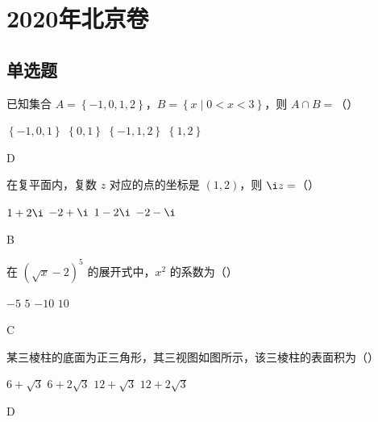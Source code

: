 \chapter{2020年北京卷}

\section{单选题}

\begin{problem}
已知集合 \(A=\left\{ -1,0,1,2 \right\}\)，\(B=\left\{ x\mid 0<x<3 \right\}\)，则 \(A\cap B=\)（\quad）

\choices
    {\(\left\{ -1,0,1 \right\}\)}
    {\(\left\{ 0,1 \right\}\)}
    {\(\left\{ -1,1,2 \right\}\)}
    {\(\left\{ 1,2 \right\}\)}
\end{problem}

\begin{answer}
D
\end{answer}

\begin{problem}
在复平面内，复数 \(z\) 对应的点的坐标是 \((1,2)\)，则 \(\i z=\)（\quad）

\choices
    {\(1+2\i\)}
    {\(-2+\i\)}
    {\(1-2\i\)}
    {\(-2-\i\)}
\end{problem}

\begin{answer}
B
\end{answer}

\begin{problem}
在 \(\left(\sqrt{x}-2\right)^5\) 的展开式中，\(x^2\) 的系数为（\quad）

\choices
    {\(-5\)}
    {\(5\)}
    {\(-10\)}
    {\(10\)}
\end{problem}

\begin{answer}
C
\end{answer}

\begin{problem}
某三棱柱的底面为正三角形，其三视图如图所示，该三棱柱的表面积为（\quad）


\choices
    {\(6+\sqrt3\)}
    {\(6+2\sqrt3\)}
    {\(12+\sqrt3\)}
    {\(12+2\sqrt3\)}
\end{problem}

\begin{answer}
D
\end{answer}

